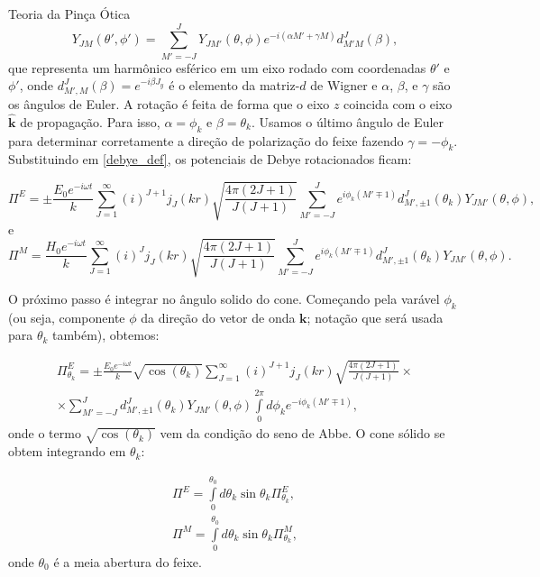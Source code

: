 \begin{chapter}{Teoria da Pinça Ótica}
\begin{equation}
Y_{JM}(\theta',\phi')=\sum \limits_{M'=-J}^{J} Y_{JM'}(\theta,\phi) e^{-i(\alpha M'+\gamma M)} d^J_{M'M}(\beta),
\label{harm_esf_rot}
\end{equation}
%
que representa um harmônico esférico em um eixo rodado com coordenadas $\theta'$ e $\phi'$, onde $d^{J}_{M',M}(\beta)=e^{-i\beta J_y}$ é o elemento da matriz-$d$ de Wigner e  $\alpha$, $\beta$, e $\gamma$ são os ângulos de Euler. A rotação é feita de forma que o eixo $z$ coincida com o eixo $\hat{{\mathbf k}}$ de propagação. Para isso, $\alpha =\phi_k$ e $\beta =\theta_k$. Usamos o último ângulo de Euler para determinar corretamente a direção de polarização do feixe fazendo $\gamma =-\phi_k$. Substituindo em \ref{debye_def}, os potenciais de Debye rotacionados ficam:

\begin{equation}
\Pi^E =\pm \frac{E_0 e^{-i\omega t}}{k}\sum \limits_{J=1}^{\infty}(i)^{J+1}j_J(kr)\sqrt{\frac{4\pi(2J+1)}{J(J+1)}} \sum \limits_{M'=-J}^J e^{i\phi_k(M'\mp1)}d^J_{M',\pm1}(\theta_k)Y_{JM'}(\theta,\phi),
\label{debyeE_rot}
\end{equation}
e
\begin{equation}
\Pi^M =\frac{H_0 e^{-i\omega t}}{k}\sum \limits_{J=1}^{\infty}(i)^{J}j_J(kr)\sqrt{\frac{4\pi(2J+1)}{J(J+1)}} \sum \limits_{M'=-J}^J e^{i\phi_k(M'\mp1)}d^J_{M',\pm1}(\theta_k)Y_{JM'}(\theta,\phi).
\label{debyeM_rot}
\end{equation}
%

O próximo passo é integrar no ângulo solido do cone. Começando pela varável $\phi_k$ (ou seja, componente $\phi$ da direção do vetor de onda ${\mathbf k}$; notação que será usada para $\theta_k$ também), obtemos:

\begin{equation}
\begin{split}
\Pi^E_{\theta_k} =\pm \frac{E_0 e^{-i\omega t}}{k}\sqrt{\cos(\theta_k)}\sum \limits_{J=1}^{\infty}(i)^{J+1}j_J(kr)\sqrt{\frac{4\pi(2J+1)}{J(J+1)}} \times \\ \times \sum\limits_{M'=-J}^J d^J_{M',\pm1}(\theta_k)Y_{JM'}(\theta,\phi) \int\limits_0^{2\pi} d\phi_k e^{-i\phi_k(M'\mp1)} ,
\label{pi_phi}
\end{split}
\end{equation}
%
onde o termo $\sqrt{\cos(\theta_k)}$ vem da condição do seno de Abbe. O cone sólido se obtem integrando em $\theta_k$:

\begin{equation}
\begin{split}
\Pi^E=\int\limits_0^{\theta_0}d\theta_k \sin\theta_k \Pi^E_{\theta_k}, \\
\Pi^M=\int\limits_0^{\theta_0}d\theta_k \sin\theta_k \Pi^M_{\theta_k},
\label{integral_theta}
\end{split}
\end{equation}
%
onde $\theta_0$ é a meia abertura do feixe.


\end{chapter}
